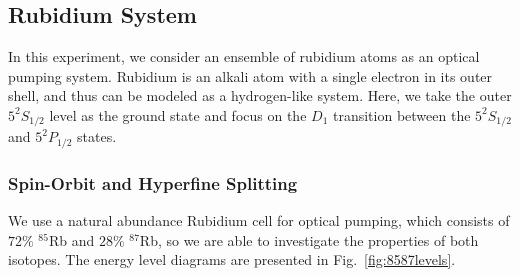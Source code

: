 \subsection{Rubidium System}

In this experiment, we consider an ensemble of rubidium atoms as an
optical pumping system. Rubidium is an alkali atom with a single
electron in its outer shell, and thus can be modeled as a
hydrogen-like system. Here, we take the outer $5^2S_{1/2}$ level as
the ground state and focus on the $D_1$ transition between the
$5^2S_{1/2}$ and $5^2P_{1/2}$ states. 

\subsubsection{Spin-Orbit and Hyperfine Splitting}
We use a natural abundance Rubidium cell for optical pumping, which
consists of $72\%$ $^{85}$Rb and $28\%$ $^{87}$Rb, so we are able to
investigate the properties of both isotopes. The energy level diagrams
are presented in Fig.~\ref{fig:8587levels}.



